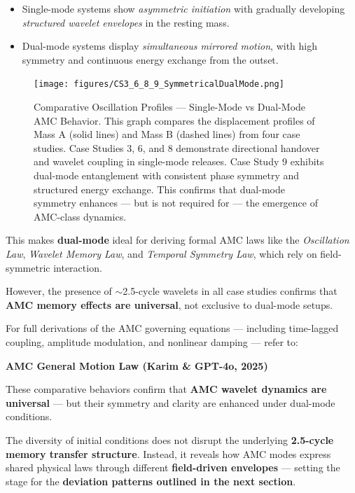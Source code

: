 \documentclass[10pt,aps,pre,onecolumn,superscriptaddress,notitlepage]{revtex4-2}
\begin{document}
\begin{itemize}
  \item Single-mode systems show \textit{asymmetric initiation} with gradually developing \textit{structured wavelet envelopes} in the resting mass.
  \item Dual-mode systems display \textit{simultaneous mirrored motion}, with high symmetry and continuous energy exchange from the outset.
\end{itemize}
\begin{figure}[htbp]
  \centering
  \texttt{[image: figures/CS3\_6\_8\_9\_SymmetricalDualMode.png]}
  \caption{Comparative Oscillation Profiles — Single-Mode vs Dual-Mode AMC Behavior. 
  This graph compares the displacement profiles of Mass A (solid lines) and Mass B (dashed lines) from four case studies. Case Studies 3, 6, and 8 demonstrate directional handover and wavelet coupling in single-mode releases. Case Study 9 exhibits dual-mode entanglement with consistent phase symmetry and structured energy exchange. This confirms that dual-mode symmetry enhances — but is not required for — the emergence of AMC-class dynamics.}
  \label{fig:CS3_6_8_9_SymmetricalDualMode}
\end{figure}

This makes \textbf{dual-mode} ideal for deriving formal AMC laws like the \textit{Oscillation Law}, \textit{Wavelet Memory Law}, and \textit{Temporal Symmetry Law}, which rely on field-symmetric interaction.

However, the presence of $\sim$2.5-cycle wavelets in all case studies confirms that \textbf{AMC memory effects are universal}, not exclusive to dual-mode setups.

For full derivations of the AMC governing equations — including time-lagged coupling, amplitude modulation, and nonlinear damping — refer to:

\textbf{AMC General Motion Law (Karim \& GPT-4o, 2025) \cite{karim2025generalmotion}}

These comparative behaviors confirm that \textbf{AMC wavelet dynamics are universal} — but their symmetry and clarity are enhanced under dual-mode conditions.  

The diversity of initial conditions does not disrupt the underlying \textbf{2.5-cycle memory transfer structure}. Instead, it reveals how AMC modes express shared physical laws through different \textbf{field-driven envelopes} — setting the stage for the \textbf{deviation patterns outlined in the next section}.  
\end{document}

